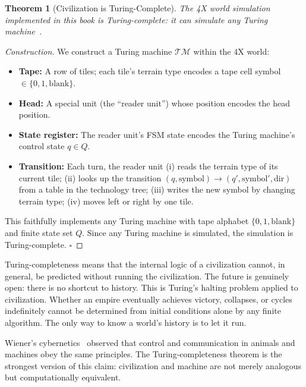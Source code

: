 \documentclass[11pt,a4paper,openany]{book}
\theoremstyle{plain}
\newtheorem{theorem}{Theorem}[chapter]
\theoremstyle{definition}
\theoremstyle{remark}
\newenvironment{perspective}{%
  \begin{mdframed}[
    linecolor=spherered!40, backgroundcolor=spherered!4,
    linewidth=1pt, innertopmargin=8pt, innerbottommargin=8pt,
    innerleftmargin=10pt, innerrightmargin=10pt,
    skipabove=10pt, skipbelow=6pt
  ]%
  \setlength{\parindent}{0pt}%
  \noindent{\textcolor{spherered}{\textbf{Perspective}}}\par\smallskip\ignorespaces
}{\end{mdframed}}
\begin{document}
\begin{theorem}[Civilization is Turing-Complete]
  The 4X world simulation implemented in this book is Turing-complete:
  it can simulate any Turing machine~\cite{Turing}.
\end{theorem}
\begin{proof}[Construction]
  We construct a Turing machine $\mathcal{TM}$ within the 4X world:
  \begin{itemize}
    \item \textbf{Tape:} A row of tiles; each tile's terrain type encodes
          a tape cell symbol $\in \{0, 1, \mathrm{blank}\}$.
    \item \textbf{Head:} A special unit (the ``reader unit'') whose
          position encodes the head position.
    \item \textbf{State register:} The reader unit's FSM state encodes
          the Turing machine's control state $q \in Q$.
    \item \textbf{Transition:} Each turn, the reader unit (i) reads the
          terrain type of its current tile; (ii) looks up the transition
          $(q, \mathrm{symbol}) \to (q', \mathrm{symbol}', \mathrm{dir})$
          from a table in the technology tree; (iii) writes the new symbol
          by changing terrain type; (iv) moves left or right by one tile.
  \end{itemize}
  This faithfully implements any Turing machine with tape alphabet
  $\{0, 1, \mathrm{blank}\}$ and finite state set $Q$. Since any Turing
  machine is simulated, the simulation is Turing-complete. $\square$
\end{proof}

\begin{perspective}
  Turing-completeness means that the internal logic of a civilization
  cannot, in general, be predicted without running the civilization.
  The future is genuinely open: there is no shortcut to history. This
  is Turing's halting problem applied to civilization. Whether an empire
  eventually achieves victory, collapses, or cycles indefinitely cannot
  be determined from initial conditions alone by any finite algorithm.
  The only way to know a world's history is to let it run.

  Wiener's cybernetics~\cite{Wiener} observed that control and
  communication in animals and machines obey the same principles.
  The Turing-completeness theorem is the strongest version of this
  claim: civilization and machine are not merely analogous but
  computationally equivalent.
\end{perspective}
\end{document}

